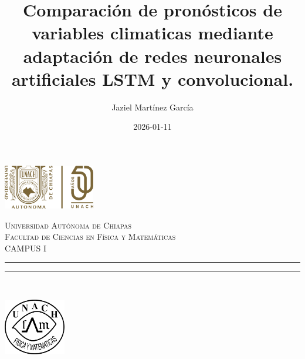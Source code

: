 \documentclass[
  us-letterpaper,
]{scrreprt}
\title{Comparación de pronósticos de variables climaticas mediante
adaptación de redes neuronales artificiales LSTM y convolucional.}
\author{Jaziel Martínez García}
\date{2026-01-11}
\theoremstyle{plain}
\theoremstyle{definition}
\theoremstyle{definition}
\theoremstyle{remark}
\begin{document}
\begin{titlepage}
\hspace{-1.9cm}
\begin{minipage}[t][0.03\textheight][c]{0.22\textwidth}
    \includegraphics[width=4.0cm]{Logo50.png}
\end{minipage}\hspace{1.3cm}
\begin{minipage}[t][0.03\textheight][c]{0.8\textwidth}
	\vspace{1.8cm}
    \begin{center}
        \textsc{\Large Universidad Autónoma de Chiapas}\\[0.3cm]
        \textsc{\Large Facultad de Ciencias en Física y Matemáticas}\\[0.3cm]
        \textsc{\large CAMPUS I}
        \vspace{0.3cm}
        \hrule height 2.5pt
        \vspace{0.3cm}
        \hrule height 1pt
    \end{center}
\end{minipage}\\ %
\begin{minipage}[t][0.79\textheight][c]{0.06\textwidth}
    \vspace{40pt}
    \begin{center}
        \vrule width1pt height10cm %
        \vspace{5mm}
        \vrule width2.5pt height10cm
        \vspace{5mm}
        \vrule width1pt height10cm
   \end{center}\vspace{0.1cm} 
   \hspace{-1.4cm}
   \begin{minipage}[b][0.08\textheight][b]{0.2\textwidth}
        \includegraphics[width=2.7cm]{logofcfm.png}

\end{minipage}
\end{minipage}
\end{titlepage}
\end{document}
